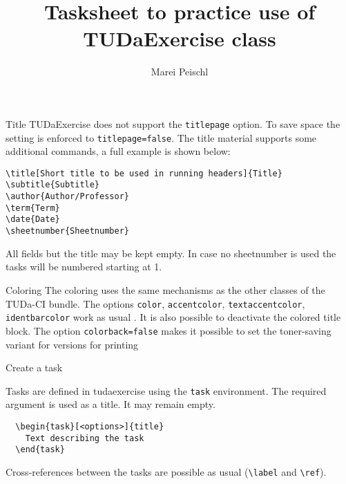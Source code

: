 \documentclass[
	english,%
	accentcolor=9c,%
	points=true, to activate referencing task properties
]{tudaexercise}
\title[TUDaExercise]{Tasksheet to practice use of TUDaExercise class}
\author{Marei Peischl}
\newcommand*{\code}[1]{\texttt{#1}}
\newcommand*{\cls}[1]{\textsf{#1}}
\newcommand*{\option}[1]{\texttt{#1}}
\newcommand*{\environment}[1]{\texttt{#1}}
\let\tbs\textbackslash
\begin{document}
\maketitle

\begin{task}{Title}
	TUDaExercise does not support the \code{titlepage} option.
	To save space the setting is enforced to \code{titlepage=false}.
	The title material supports some additional commands, a full example is shown below:

\begin{verbatim}
\title[Short title to be used in running headers]{Title}
\subtitle{Subtitle}
\author{Author/Professor}
\term{Term}
\date{Date}
\sheetnumber{Sheetnumber}
\end{verbatim}

	All fields but the title may be kept empty.
	In case no sheetnumber is used the tasks will be numbered starting at 1.
\end{task}

\begin{task}{Coloring}
	The coloring uses the same mechanisms as the other classes of the TUDa-CI bundle. The options \option{color},
	\option{accentcolor}, \option{textaccentcolor}, \option{identbarcolor} work as usual \cite[see][]{tuda-ci}. It is also possible to
	deactivate the colored title block.
	The option \option{colorback=false} makes it possible to set the toner-saving variant for
	versions for printing
\end{task}

\begin{task}{Create a task}

	Tasks are defined in \cls{tudaexercise} using the \environment{task} environment. The required argument is used as a title. It may remain empty.

\begin{verbatim}
  \begin{task}[<options>]{title}
    Text describing the task
  \end{task}
\end{verbatim}

	Cross-references between the tasks are possible as usual (\code{\tbs{}label} and \code{\tbs{}ref}).

\end{task}
\end{document}
